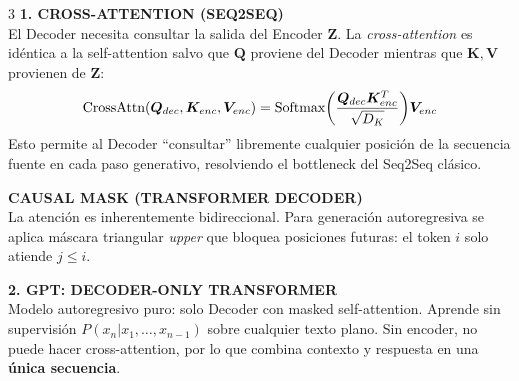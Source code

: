 \documentclass[8pt,a4paper,landscape,fleqn]{extarticle}
\begin{document}
\begin{multicols*}{3}
\textbf{1. CROSS-ATTENTION (SEQ2SEQ)}\\
El Decoder necesita consultar la salida del Encoder $\bm{Z}$. La \textit{cross-attention} es idéntica a la self-attention salvo que $\bm{Q}$ proviene del Decoder mientras que $\bm{K}, \bm{V}$ provienen de $\bm{Z}$:
$$\text{CrossAttn}(\bm{Q}_{dec},\bm{K}_{enc},\bm{V}_{enc}) = \text{Softmax}\!\left(\frac{\bm{Q}_{dec}\bm{K}_{enc}^T}{\sqrt{\smash[b]{D_K}}}\right)\!\bm{V}_{enc}$$
Esto permite al Decoder ``consultar'' libremente cualquier posición de la secuencia fuente en cada paso generativo, resolviendo el bottleneck del Seq2Seq clásico.
 
\textbf{CAUSAL MASK (TRANSFORMER DECODER)}\\
La atención es inherentemente bidireccional. Para generación autoregresiva se aplica máscara triangular \textit{upper} que bloquea posiciones futuras: el token $i$ solo atiende $j \leq i$.
\vspace{-2mm}
\begin{center}
\end{center}
 
\textbf{2. GPT: DECODER-ONLY TRANSFORMER}\\
Modelo autoregresivo puro: solo Decoder con masked self-attention. Aprende sin supervisión $P(x_n | x_1, \dots, x_{n-1})$ sobre cualquier texto plano. Sin encoder, no puede hacer cross-attention, por lo que combina contexto y respuesta en una \textbf{única secuencia}.
 

\end{multicols*}
\end{document}
